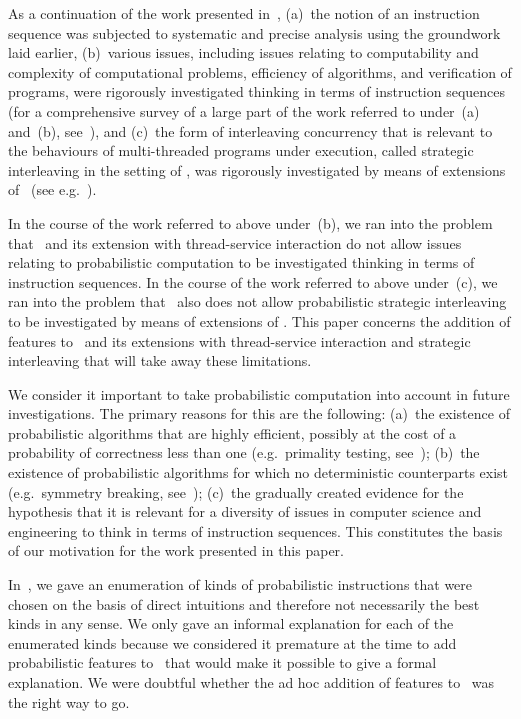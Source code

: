 \documentclass{llncs}
\begin{document}
As a continuation of the work presented in~\cite{BL02a,BP02a},
(a)~the notion of an instruction sequence was subjected to systematic
and precise analysis using the groundwork laid earlier,
(b)~various issues, including issues relating to computability and 
complexity of computational problems, efficiency of algorithms, and
verification of programs, were rigorously investigated thinking in terms 
of instruction sequences (for a comprehensive survey of a large part of 
the work referred to under~(a) and~(b), see~\cite{BM12b}), and 
(c)~the form of interleaving concurrency that is relevant to the 
behaviours of multi-threaded programs under execution, called strategic
interleaving in the setting of \BTA, was rigorously investigated by 
means of extensions of \BTA\ (see e.g.~\cite{BM04c,BM06a,BM07a}). 

In the course of the work referred to above under~(b), we ran into the 
problem that \BTA\ and its extension with thread-service interaction 
do not allow issues relating to probabilistic computation to be 
investigated thinking in terms of instruction sequences.  
In the course of the work referred to above under~(c), we ran into the 
problem that \BTA\ also does not allow probabilistic strategic 
interleaving to be investigated by means of extensions of \BTA.
This paper concerns the addition of features to \BTA\ and its extensions 
with thread-service interaction and strategic interleaving that will 
take away these limitations.

We consider it important to take probabilistic computation into account
in future investigations.
The primary reasons for this are the following:
(a)~the existence of probabilistic algorithms that are highly efficient, 
possibly at the cost of a probability of correctness less than one 
(e.g.\ primality testing, see~\cite{Rab80a});
(b)~the existence of probabilistic algorithms for which no deterministic 
counterparts exist (e.g.\ symmetry breaking, see~\cite{IR90a});
(c)~the gradually created evidence for the hypothesis that it is 
relevant for a diversity of issues in computer science and engineering 
to think in terms of instruction sequences.
This constitutes the basis of our motivation for the work presented in 
this paper. 

In~\cite{BM09f}, we gave an enumeration of kinds of probabilistic 
instructions that were chosen on the basis of direct intuitions and 
therefore not necessarily the best kinds in any sense.
We only gave an informal explanation for each of the enumerated kinds
because we considered it premature at the time to add probabilistic 
features to \BTA\ that would make it possible to give a formal 
explanation.
We were doubtful whether the ad hoc addition of features to \BTA\ was 
the right way to go.
\end{document}
